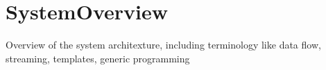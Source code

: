 \chapter{SystemOverview}
\label{chapter:SystemOverview}

Overview of the system architexture, including terminology like 
data flow, streaming, templates, generic programming

